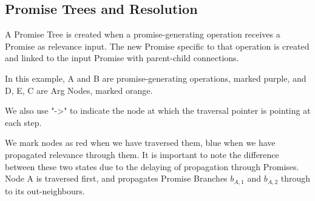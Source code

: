 \documentclass{article}
\begin{document}
\subsection{Promise Trees and Resolution}
\label{appendix:promise-trees}
A Promise Tree is created when a promise-generating operation receives a Promise as relevance input.
The new Promise specific to that operation is created and linked to the input Promise with parent-child connections.

In this example, A and B are promise-generating operations, marked purple, and D, E, C are Arg Nodes, marked orange.

We also use "->" to indicate the node at which the traversal pointer is pointing at each step.

\begin{center}
\end{center}

We mark nodes as red when we have traversed them, blue when we have propagated relevance through them.
It is important to note the difference between these two states due to the delaying of propagation through Promises.
Node A is traversed first, and propagates Promise Branches $b_{A,1}$ and $b_{A,2}$ through to its out-neighbours.
\end{document}
